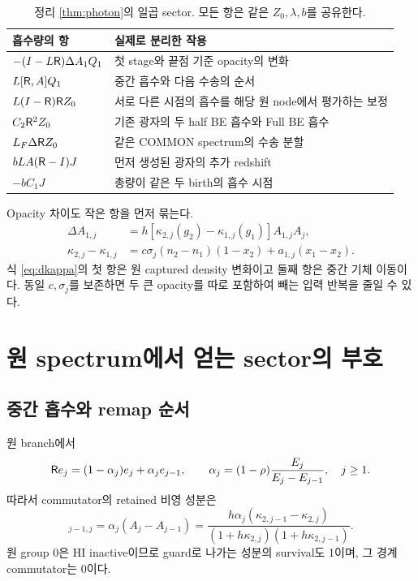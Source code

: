 \begin{table}[H]
\centering\small
\begin{tabularx}{\textwidth}{@{}p{57mm}X@{}}
\toprule
흡수량의 항 & 실제로 분리한 작용\\
\midrule
$-(I-L\mathsf R)\Delta A_1Q_1$ & 첫 stage와 끝점 기준 opacity의 변화\\
$L[\mathsf R,A]Q_1$ & 중간 흡수와 다음 수송의 순서\\
$L(I-\mathsf R)\mathsf R Z_0$ & 서로 다른 시점의 흡수를 해당 원 node에서 평가하는 보정\\
$C_2\mathsf R^2Z_0$ & 기존 광자의 두 half BE 흡수와 Full BE 흡수\\
$L_F\Delta\mathsf R Z_0$ & 같은 COMMON spectrum의 수송 분할\\
$bLA(\mathsf R-I)J$ & 먼저 생성된 광자의 추가 redshift\\
$-bC_1J$ & 총량이 같은 두 birth의 흡수 시점\\
\bottomrule
\end{tabularx}
\caption{정리 \ref{thm:photon}의 일곱 sector. 모든 항은 같은 $Z_0,\lambda,b$를 공유한다.}
\label{tab:sectors}
\end{table}

Opacity 차이도 작은 항을 먼저 묶는다.
\begin{align}
\Delta A_{1,j}
&=h[\kappa_{2,j}(g_2)-\kappa_{1,j}(g_1)]A_{1,j}A_j,
\label{eq:dA}\\
\kappa_{2,j}-\kappa_{1,j}
&=c\sigma_j(n_2-n_1)(1-x_2)+a_{1,j}(x_1-x_2).
\label{eq:dkappa}
\end{align}
식 \eqref{eq:dkappa}의 첫 항은 원 captured density 변화이고 둘째 항은 중간 기체 이동이다. 동일 $c,\sigma_j$를 보존하면 두 큰 opacity를 따로 포함하여 빼는 입력 반복을 줄일 수 있다.

\section{원 spectrum에서 얻는 sector의 부호}\label{sec:signs}
\subsection{중간 흡수와 remap 순서}
원 branch에서
\begin{equation}
\mathsf R e_j=(1-\alpha_j)e_j+\alpha_je_{j-1},\qquad
\alpha_j=(1-\rho)\frac{E_j}{E_j-E_{j-1}},\quad j\ge1.
\label{eq:alpha}
\end{equation}
따라서 commutator의 retained 비영 성분은
\begin{equation}
[\R,A]_{j-1,j}
=\alpha_j(A_j-A_{j-1})
=\frac{h\alpha_j(\kappa_{2,j-1}-\kappa_{2,j})}
{(1+h\kappa_{2,j})(1+h\kappa_{2,j-1})}.
\label{eq:comm}
\end{equation}
원 group 0은 HI inactive이므로 guard로 나가는 성분의 survival도 1이며, 그 경계 commutator는 0이다.

